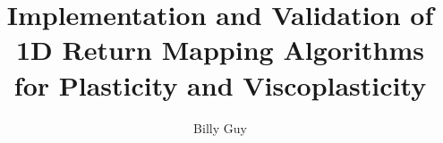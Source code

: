 \documentclass[preprint,12pt]{elsarticle}
\begin{document}
\begin{frontmatter}



\title{Implementation and Validation of 1D Return Mapping 
Algorithms for Plasticity and Viscoplasticity}


\author{Billy Guy} %


\begin{abstract}


\end{abstract}
\end{frontmatter}
\end{document}
